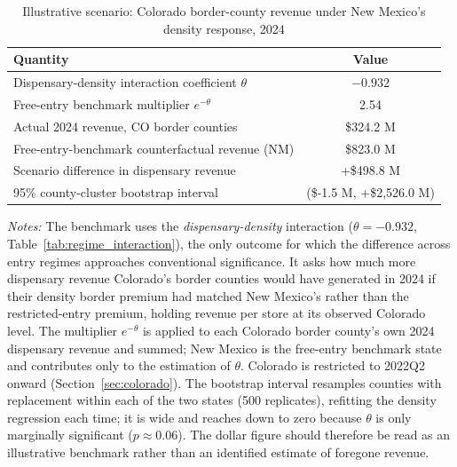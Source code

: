 \begin{table}[htbp]
\centering
\caption{Illustrative scenario: Colorado border-county revenue under New Mexico's density response, 2024}
\label{tab:counterfactual}
\footnotesize
\begin{tabular}{lc}
\toprule
Quantity & Value \\
\midrule
Dispensary-density interaction coefficient $\theta$ & $-0.932$ \\
Free-entry benchmark multiplier $e^{-\theta}$ & 2.54 \\
\midrule
Actual 2024 revenue, CO border counties & \$324.2 M \\
Free-entry-benchmark counterfactual revenue (NM) & \$823.0 M \\
Scenario difference in dispensary revenue & +\$498.8 M \\
95\% county-cluster bootstrap interval & (\$-1.5 M, +\$2{,}526.0 M) \\
\bottomrule
\end{tabular}
\begin{minipage}{0.98\textwidth}
\vspace{0.5em}

\fontsize{9pt}{11pt}\selectfont
\textit{Notes:} The benchmark uses the \emph{dispensary-density} interaction
($\theta=-0.932$, Table~\ref{tab:regime_interaction}), the only outcome for which the
difference across entry regimes approaches conventional significance. It asks how much
more dispensary revenue Colorado's border counties would have generated in 2024
if their density border premium had matched New Mexico's rather than the
restricted-entry premium, holding revenue per store at its observed Colorado
level. The multiplier $e^{-\theta}$ is applied to each Colorado border county's
own 2024 dispensary revenue and summed; New Mexico is the free-entry benchmark
state and contributes only to the estimation of $\theta$. Colorado is restricted
to 2022Q2 onward (Section~\ref{sec:colorado}). The bootstrap interval resamples
counties with replacement within each of the two states (500 replicates),
refitting the density regression each time; it is wide and reaches down to zero
because $\theta$ is only marginally significant ($p\approx0.06$). The dollar
figure should therefore be read as an illustrative benchmark rather than an
identified estimate of foregone revenue.
\end{minipage}
\end{table}
